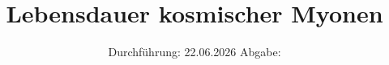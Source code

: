 

\subject{v01}
\title{Lebensdauer kosmischer Myonen}
\date{%
  Durchführung: 22.06.2026
  \hspace{3em}
  Abgabe: 
}



\maketitle
\thispagestyle{empty}
\tableofcontents
\newpage






\printbibliography{}


